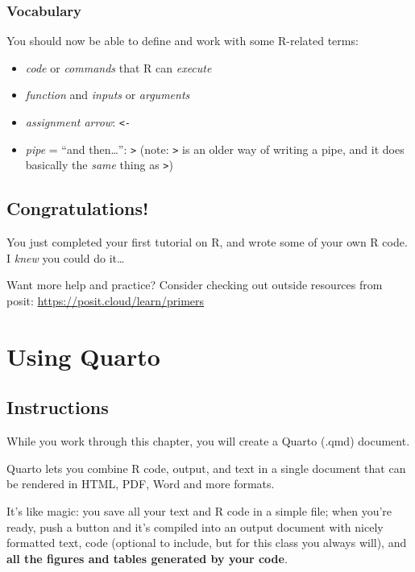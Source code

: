 \documentclass[
  letterpaper,
  DIV=11,
  numbers=noendperiod]{scrreprt}
\providecommand{\tightlist}{%
  \setlength{\itemsep}{0pt}\setlength{\parskip}{0pt}}\usepackage{longtable,booktabs,array}
\theoremstyle{remark}
\begin{document}
\subsection{Vocabulary}\label{vocabulary}

You should now be able to define and work with some R-related terms:

\begin{itemize}
\tightlist
\item
  \emph{code} or \emph{commands} that R can \emph{execute}
\item
  \emph{function} and \emph{inputs} or \emph{arguments}
\item
  \emph{assignment arrow}: \texttt{\textless{}-}
\item
  \emph{pipe} = ``and then\ldots{}'': \texttt{\textbar{}\textgreater{}}
  (note: \texttt{\textbar{}\textgreater{}} is an older way of writing a
  pipe, and it does basically the \emph{same} thing as
  \texttt{\textbar{}\textgreater{}})
\end{itemize}

\section{Congratulations!}\label{congratulations}

You just completed your first tutorial on R, and wrote some of your own
R code. I \emph{knew} you could do it\ldots{}

Want more help and practice? Consider checking out outside resources
from posit: \url{https://posit.cloud/learn/primers}

\chapter{Using Quarto}\label{using-quarto}

\section{Instructions}\label{instructions}

While you work through this chapter, you will create a Quarto (.qmd)
document.

Quarto lets you combine R code, output, and text in a single document
that can be rendered in HTML, PDF, Word and more formats.

It's like magic: you save all your text and R code in a simple file;
when you're ready, push a button and it's compiled into an output
document with nicely formatted text, code (optional to include, but for
this class you always will), and \textbf{all the figures and tables
generated by your code}.
\end{document}
